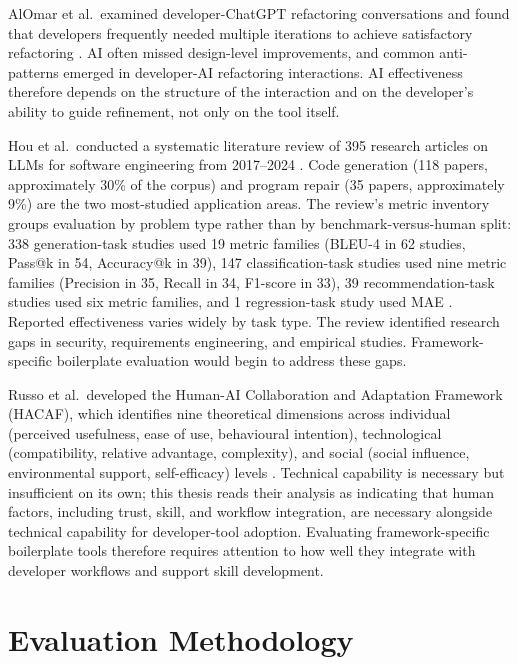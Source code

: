 \documentclass[12pt,a4paper]{report}
\begin{document}
AlOmar et al.\ examined developer-ChatGPT refactoring conversations and found that developers frequently needed multiple iterations to achieve satisfactory refactoring \parencite{alomar2024refactoring}. AI often missed design-level improvements, and common anti-patterns emerged in developer-AI refactoring interactions. AI effectiveness therefore depends on the structure of the interaction and on the developer's ability to guide refinement, not only on the tool itself.

Hou et al.\ conducted a systematic literature review of 395 research articles on LLMs for software engineering from 2017--2024 \parencite{hou2024llmse}. Code generation (118 papers, approximately 30\% of the corpus) and program repair (35 papers, approximately 9\%) are the two most-studied application areas. The review's metric inventory groups evaluation by problem type rather than by benchmark-versus-human split: 338 generation-task studies used 19 metric families (BLEU-4 in 62 studies, Pass@k in 54, Accuracy@k in 39), 147 classification-task studies used nine metric families (Precision in 35, Recall in 34, F1-score in 33), 39 recommendation-task studies used six metric families, and 1 regression-task study used MAE \parencite{hou2024llmse}. Reported effectiveness varies widely by task type. The review identified research gaps in security, requirements engineering, and empirical studies. Framework-specific boilerplate evaluation would begin to address these gaps.

Russo et al.\ developed the Human-AI Collaboration and Adaptation Framework (HACAF), which identifies nine theoretical dimensions across individual (perceived usefulness, ease of use, behavioural intention), technological (compatibility, relative advantage, complexity), and social (social influence, environmental support, self-efficacy) levels \parencite{russo2024navigating}. Technical capability is necessary but insufficient on its own; this thesis reads their analysis as indicating that human factors, including trust, skill, and workflow integration, are necessary alongside technical capability for developer-tool adoption. Evaluating framework-specific boilerplate tools therefore requires attention to how well they integrate with developer workflows and support skill development.

\section{Evaluation Methodology}
\end{document}
